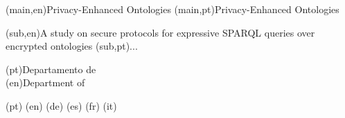 

%


\nttitle(main,en){Privacy-Enhanced Ontologies}%
\nttitle(main,pt){Privacy-Enhanced Ontologies}%

\nttitle(sub,en){A study on secure protocols for expressive SPARQL queries over encrypted ontologies}%
\nttitle(sub,pt){...}%

\ntdepartment(pt){Departamento de\\}
\ntdepartment(en){Department of\\}

\ntdegreename(pt){}
\ntdegreename(en){}
\ntdegreename(de){}
\ntdegreename(es){}
\ntdegreename(fr){}
\ntdegreename(it){}

